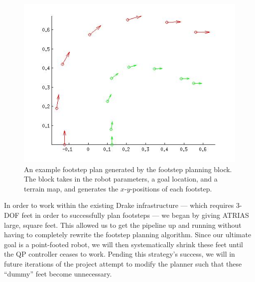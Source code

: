 \documentclass[letterpaper, 10 pt, conference]{ieeeconf}  %
\begin{document}
   \begin{figure}[thpb]
      \centering
      \includegraphics[scale=0.5]{figures/footstep_plan.jpg}
      \caption{An example footstep plan generated by the footstep planning block. The block takes in the robot parameters, a goal location, and a terrain map, and generates the $x$-$y$-positions of each footstep.}
      \label{footstep}
   \end{figure}

In order to work within the existing Drake infrastructure --- which requires 3-DOF feet in order to successfully plan footsteps --- we began by giving ATRIAS large, square feet. This allowed us to get the pipeline up and running without having to completely rewrite the footstep planning algorithm. Since our ultimate goal is a point-footed robot, we will then systematically shrink these feet until the QP controller ceases to work. Pending this strategy’s success, we will in future iterations of the project attempt to modify the planner such that these “dummy” feet become unnecessary.
\end{document}
